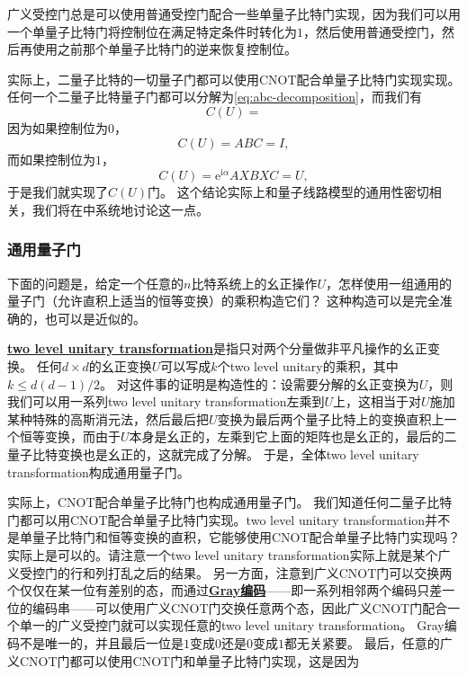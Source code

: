 \documentclass[hyperref, UTF8, a4paper]{ctexart}
\newcommand*{\ii}{\mathrm{i}}
\newcommand*{\ee}{\mathrm{e}}
\renewcommand{\autoref}{\prettyref}
\newcommand*{\concept}[1]{\underline{\textbf{#1}}}
\begin{document}
广义受控门总是可以使用普通受控门配合一些单量子比特门实现，因为我们可以用一个单量子比特门将控制位在满足特定条件时转化为$1$，然后使用普通受控门，然后再使用之前那个单量子比特门的逆来恢复控制位。

实际上，二量子比特的一切量子门都可以使用CNOT配合单量子比特门实现实现。
任何一个二量子比特量子门都可以分解为\eqref{eq:abc-decomposition}，而我们有
\begin{equation}
    C(U) = 
\end{equation}
因为如果控制位为$0$，
\[
    C(U) = ABC = I,
\]
而如果控制位为$1$，
\[
    C(U) = \ee^{\ii \alpha} A X B X C = U,
\]
于是我们就实现了$C(U)$门。
这个结论实际上和量子线路模型的通用性密切相关，我们将在\autoref{sec:universal}中系统地讨论这一点。

\subsubsection{通用量子门}\label{sec:universal}

下面的问题是，给定一个任意的$n$比特系统上的幺正操作$U$，怎样使用一组通用的量子门（允许直积上适当的恒等变换）的乘积构造它们？
这种构造可以是完全准确的，也可以是近似的。

\concept{two level unitary transformation}是指只对两个分量做非平凡操作的幺正变换。
任何$d \times d$的幺正变换$U$可以写成$k$个two level unitary的乘积，其中$k \leq d(d-1)/2$。
对这件事的证明是构造性的：设需要分解的幺正变换为$U$，则我们可以用一系列two level unitary transformation左乘到$U$上，这相当于对$U$施加某种特殊的高斯消元法，然后最后把$U$变换为最后两个量子比特上的变换直积上一个恒等变换，而由于$U$本身是幺正的，左乘到它上面的矩阵也是幺正的，最后的二量子比特变换也是幺正的，这就完成了分解。
于是，全体two level unitary transformation构成通用量子门。

实际上，CNOT配合单量子比特门也构成通用量子门。
我们知道任何二量子比特门都可以用CNOT配合单量子比特门实现。two level unitary transformation并不是单量子比特门和恒等变换的直积，它能够使用CNOT配合单量子比特门实现吗？
实际上是可以的。请注意一个two level unitary transformation实际上就是某个广义受控门的行和列打乱之后的结果。
另一方面，注意到广义CNOT门可以交换两个仅仅在某一位有差别的态，而通过\concept{Gray编码}——即一系列相邻两个编码只差一位的编码串——可以使用广义CNOT门交换任意两个态，因此广义CNOT门配合一个单一的广义受控门就可以实现任意的two level unitary transformation。
Gray编码不是唯一的，并且最后一位是$1$变成$0$还是$0$变成$1$都无关紧要。
最后，任意的广义CNOT门都可以使用CNOT门和单量子比特门实现，这是因为
\end{document}
